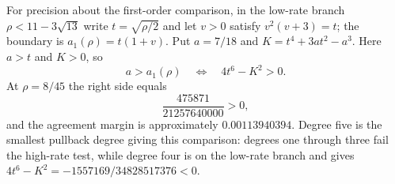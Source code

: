 For precision about the first-order comparison, in the low-rate branch $\rho<11-3\sqrt{13}$ write $t=\sqrt{\rho/2}$ and let $v>0$ satisfy $v^2(v+3)=t$; the boundary is $a_1(\rho)=t(1+v)$. Put $a=7/18$ and $K=t^4+3at^2-a^3$. Here $a>t$ and $K>0$, so
\[
a>a_1(\rho)\quad\Longleftrightarrow\quad4t^6-K^2>0.
\]
At $\rho=8/45$ the right side equals
\[
\frac{475871}{21257640000}>0,
\]
and the agreement margin is approximately $0.00113940394$. Degree five is the smallest pullback degree giving this comparison: degrees one through three fail the high-rate test, while degree four is on the low-rate branch and gives $4t^6-K^2=-1557169/34828517376<0$.

